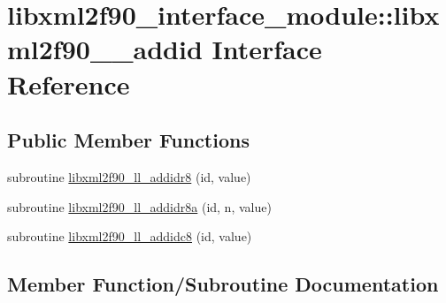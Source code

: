 \hypertarget{interfacelibxml2f90__interface__module_1_1libxml2f90____addid}{}\section{libxml2f90\+\_\+interface\+\_\+module\+:\+:libxml2f90\+\_\+\+\_\+addid Interface Reference}
\label{interfacelibxml2f90__interface__module_1_1libxml2f90____addid}
\subsection*{Public Member Functions}
\begin{DoxyCompactItemize}
\item 
subroutine \hyperlink{interfacelibxml2f90__interface__module_1_1libxml2f90____addid_acecc86afe5b5de9df74cfb9d4baf129a}{libxml2f90\+\_\+ll\+\_\+addidr8} (id, value)
\item 
subroutine \hyperlink{interfacelibxml2f90__interface__module_1_1libxml2f90____addid_abb6ee1f76f80fab72d6b6e6c9ed66a66}{libxml2f90\+\_\+ll\+\_\+addidr8a} (id, n, value)
\item 
subroutine \hyperlink{interfacelibxml2f90__interface__module_1_1libxml2f90____addid_af7590af77ac066d6e26441bda793a88c}{libxml2f90\+\_\+ll\+\_\+addidc8} (id, value)
\end{DoxyCompactItemize}


\subsection{Member Function/\+Subroutine Documentation}
